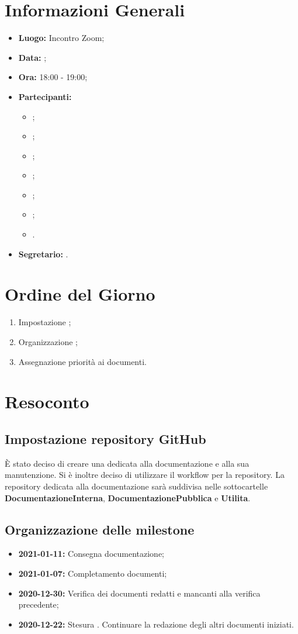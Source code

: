 \section{Informazioni Generali}
\begin{itemize}
\item \textbf{Luogo:} Incontro Zoom;
\item \textbf{Data:} \Data;
\item \textbf{Ora:} 18:00 - 19:00;
\item \textbf{Partecipanti:}
	\begin{itemize}
		\item \BL{}; 
		\item \FF{};
		\item \MM{}; 
		\item \PC{};
		\item \TG{};
		\item \TL{};
		\item \VD{}.
	\end{itemize} 
\item \textbf{Segretario:} \PC{}.
\end{itemize}

\section{Ordine del Giorno}
\begin{enumerate}
 \item Impostazione  ;
 \item Organizzazione ;
 \item Assegnazione priorità ai documenti.
\end{enumerate}

\section{Resoconto}
\subsection{Impostazione repository GitHub}
È stato deciso di creare una  dedicata alla documentazione e alla sua manutenzione. Si è inoltre deciso di utilizzare il workflow  per la repository. La repository dedicata alla documentazione sarà suddivisa nelle sottocartelle \textbf{DocumentazioneInterna}, \textbf{DocumentazionePubblica} e \textbf{Utilita}.
\subsection{Organizzazione delle milestone}
 \begin{itemize}
  \item \textbf{2021-01-11:} Consegna documentazione;
  \item \textbf{2021-01-07:} Completamento documenti;
  \item \textbf{2020-12-30:} Verifica dei documenti redatti e mancanti alla verifica precedente;
  \item \textbf{2020-12-22:} Stesura \PdP. Continuare la redazione degli altri documenti iniziati.
 \end{itemize}

